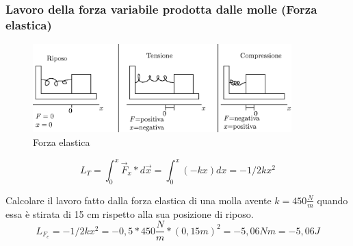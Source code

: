 \subsubsection{Lavoro della forza variabile prodotta dalle molle (Forza elastica)}
\begin{figure}[th]
    \centering
    \includegraphics[width=10cm]{img/finiti/forza_elastica.eps}
    \caption{Forza elastica}
\end{figure}
\begin{equation}
  L_T=\int^{x}_0 \vec{F}_x*d\vec{x}=\int^x_0(-kx)dx=-1/2kx^2
\end{equation}

\begin{esempio}
  Calcolare il lavoro fatto dalla forza elastica di una molla avente $k=450\frac{N}{m}$ quando
  essa è stirata di 15 cm rispetto alla  sua posizione di riposo.
  \begin{equation}
    L_{F_e}= -1/2 kx^2=-0,5 * 450 \frac{N}{m}*(0,15m)^2=-5,06Nm=-5,06J
  \end{equation}
\end{esempio}
\clearpage
